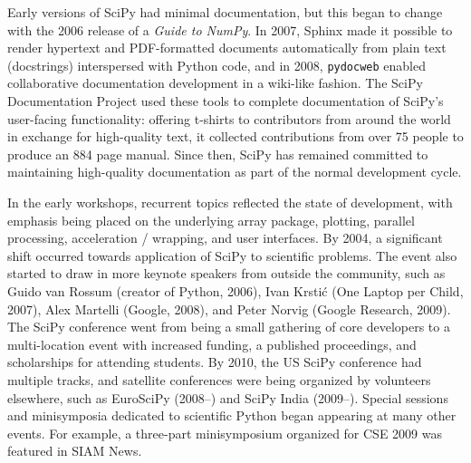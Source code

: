 \documentclass[fleqn,10pt]{wlscirep}
\begin{document}
Early versions of SciPy had minimal documentation, but this began to change
with the 2006 release of a \emph{Guide to NumPy}\cite{oliphant2006guide}.
In 2007, Sphinx\cite{sphinx} made it possible to render hypertext and
PDF-formatted documents automatically from plain text (docstrings)
interspersed with Python code, and in 2008, \texttt{pydocweb}\cite{pydocweb}
enabled collaborative documentation development in a wiki-like fashion.
The SciPy Documentation Project \cite{vanderwalt2008scipy, harrington2008scipy}
used these tools to complete documentation of SciPy's user-facing
functionality: offering t-shirts to contributors from around the world in
exchange for high-quality text, it collected contributions from over 75 people
to produce an 884 page manual\cite{harrington2009scipy}. Since then,
SciPy has remained committed to maintaining high-quality documentation as
part of the normal development cycle.


In the early workshops, recurrent topics reflected the state of development, with
emphasis being placed on the underlying array package, plotting,
parallel processing, acceleration / wrapping, and user interfaces.  By
2004, a significant shift occurred towards application of SciPy to
scientific problems.  The event also started to draw in more keynote
speakers from outside the community, such as Guido van Rossum (creator
of Python, 2006), Ivan Krstić (One Laptop per Child, 2007), Alex
Martelli (Google, 2008), and Peter Norvig (Google Research, 2009).
The SciPy conference went from being a small gathering of
core developers to a multi-location event with increased funding, a
published proceedings, and scholarships for attending students.
By 2010, the US SciPy conference had multiple tracks, and satellite
conferences were being organized by volunteers elsewhere, such as EuroSciPy
(2008–) and SciPy India (2009–).
Special sessions and minisymposia dedicated to scientific Python began
appearing at many other events.
For example, a three-part minisymposium organized for CSE 2009 was
featured in SIAM News\cite{siamcse09}.
\end{document}

